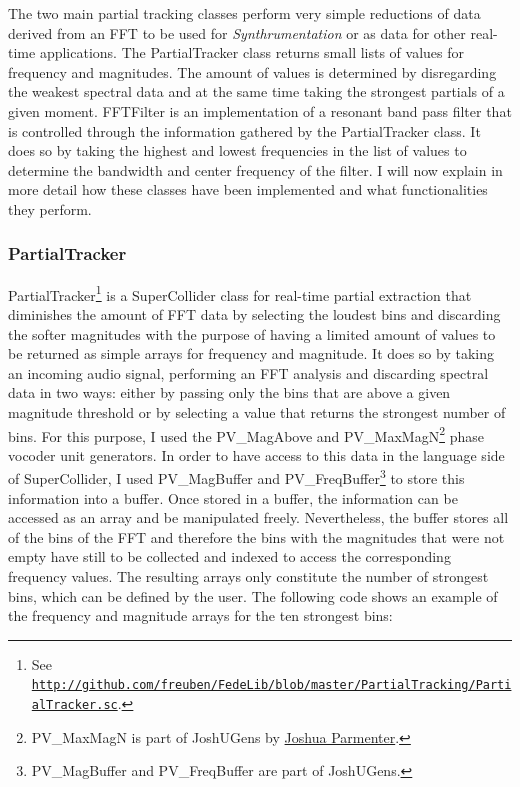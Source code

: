 The two main partial tracking classes perform very simple reductions of data derived from an FFT to be used for \emph{Synthrumentation} or as data for other real-time applications. The PartialTracker class returns small lists of values for frequency and magnitudes. The amount of values is determined by disregarding the weakest spectral data and at the same time taking the strongest partials of a given moment. FFTFilter is an implementation of a resonant band pass filter that is controlled through the information gathered by the PartialTracker class. It does so by taking the highest and lowest frequencies in the list of values to determine the bandwidth and center frequency of the filter. I will now explain in more detail how these classes have been implemented and what functionalities they perform.

\subsubsection{PartialTracker}
\hypertarget{partrack}{}

PartialTracker\footnote{See \href{http://github.com/freuben/FedeLib/blob/master/PartialTracking/PartialTracker.sc} {\texttt{http://github.com/freuben/FedeLib/blob/master/PartialTracking/PartialTracker.sc}}.} is a SuperCollider class for real-time partial extraction that diminishes the amount of FFT data by selecting the loudest bins and discarding the softer magnitudes with the purpose of having a limited amount of values to be returned as simple arrays for frequency and magnitude. It does so by taking an incoming audio signal, performing an FFT analysis and discarding spectral data in two ways: either by passing only the bins that are above a given magnitude threshold or by selecting a value that returns the strongest number of bins. For this purpose, I used the PV\_MagAbove and PV\_MaxMagN\footnote{PV\_MaxMagN is part of JoshUGens by \href{http://www.realizedsound.net/josh/}{Joshua Parmenter}.} phase vocoder unit generators. In order to have access to this data in the language side of SuperCollider, I used PV\_MagBuffer and PV\_FreqBuffer\footnote{PV\_MagBuffer and PV\_FreqBuffer are part of JoshUGens.} to store this information into a buffer. Once stored in a buffer, the information can be accessed as an array and be manipulated freely. Nevertheless, the buffer stores all of the bins of the FFT and therefore the bins with the magnitudes that were not empty have still to be collected and indexed to access the corresponding frequency values. The resulting arrays only constitute the number of strongest bins, which can be defined by the user. The following code shows an example of the frequency and magnitude arrays for the ten strongest bins:


